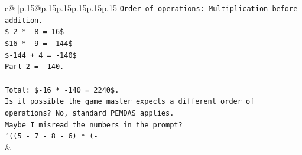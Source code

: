 \documentclass{article}
\begin{document}
{\begin{supertabular}{c@{$\;$}|p{.15\linewidth}@{}p{.15\linewidth}p{.15\linewidth}p{.15\linewidth}p{.15\linewidth}p{.15\linewidth}}
{{{\texttt{Order of operations: Multiplication before addition.} \\
\texttt{\${-}2 * {-}8 = 16\$} \\
\texttt{\$16 * {-}9 = {-}144\$} \\
\texttt{\${-}144 + 4 = {-}140\$} \\
\texttt{Part 2 = {-}140.} \\
\\ 
\texttt{Total: \${-}16 * {-}140 = 2240\$.} \\
\texttt{Is it possible the game master expects a different order of operations? No, standard PEMDAS applies.} \\
\texttt{Maybe I misread the numbers in the prompt?} \\
\texttt{`((5 {-} 7 {-} 8 {-} 6) * ({-}} \\
            }
        }
    }
    & \\ \\

\end{supertabular}
}
\end{document}
